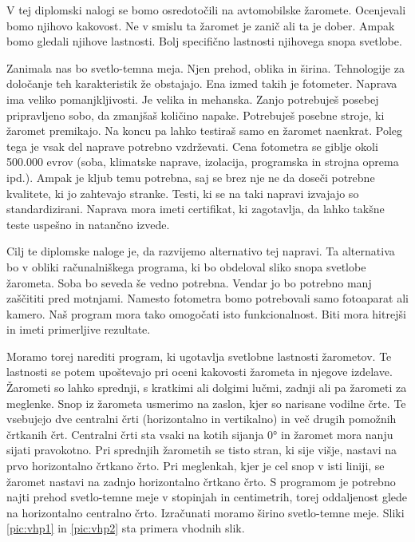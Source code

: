 \documentclass[oneside, a4paper, 12pt]{book}
\begin{document}
V tej diplomski nalogi se bomo osredotočili na avtomobilske žaromete. 
Ocenjevali bomo njihovo kakovost. Ne v smislu ta žaromet je zanič ali 
ta je dober. Ampak bomo gledali njihove lastnosti. Bolj specifično 
lastnosti njihovega snopa svetlobe.

Zanimala nas bo svetlo-temna meja. Njen prehod, oblika in širina. 
Tehnologije za določanje teh karakteristik že obstajajo. Ena izmed 
takih je fotometer. Naprava ima veliko pomanjkljivosti. Je velika in 
mehanska. Zanjo potrebuješ posebej pripravljeno sobo, da zmanjšaš količino 
napake. Potrebuješ posebne stroje, ki žaromet premikajo. Na koncu pa 
lahko testiraš samo en žaromet naenkrat. Poleg tega je vsak del 
naprave potrebno vzdrževati. Cena fotometra se giblje okoli 500.000 evrov
(soba, klimatske naprave, izolacija, programska in strojna oprema ipd.).
Ampak je kljub temu potrebna, saj se brez nje ne da doseči potrebne 
kvalitete, ki jo zahtevajo stranke. Tes\-ti, ki se na taki napravi 
izvajajo so standardizirani. Naprava mora imeti certifikat, ki zagotavlja, 
da lahko takšne teste uspešno in natančno izvede.

Cilj te diplomske naloge je, da razvijemo alternativo tej napravi. 
Ta alternativa bo v obliki računalniškega programa, ki bo obdeloval 
sliko snopa svetlobe žarometa. Soba bo seveda še vedno potrebna. 
Vendar jo bo potrebno manj zaščititi pred motnjami. Namesto fotometra 
bomo potrebovali samo fotoaparat ali kamero. Naš program mora tako 
omogočati isto funkcionalnost. Biti mora hitrejši in imeti primerljive 
rezultate.

Moramo torej narediti program, ki ugotavlja svetlobne lastnosti žarometov. 
Te lastnosti se potem upoštevajo pri oceni kakovosti žarometa in njegove 
izdelave. Žarometi so lahko sprednji, s kratkimi ali dolgimi lučmi, zadnji 
ali pa žarometi za meglenke. Snop iz žarometa usmerimo na zaslon, kjer so 
narisane vodilne črte. Te vsebujejo dve centralni črti (horizontalno in 
vertikalno) in več drugih pomožnih črtkanih črt. Centralni črti sta vsaki 
na kotih sijanja 0° in žaromet mora nanju sijati pravokotno. Pri sprednjih 
žarometih se tisto stran, ki sije višje, nastavi na prvo horizontalno 
črtkano črto. Pri meglenkah, kjer je cel snop v isti liniji, se žaromet 
nastavi na zadnjo horizontalno črtkano črto. S programom je potrebno najti 
prehod svetlo-temne meje v stopinjah in centimetrih, torej oddaljenost 
glede na horizontalno centralno črto. Izračunati moramo širino svetlo-temne 
meje. Sliki \ref{pic:vhp1} in \ref{pic:vhp2} sta primera vhodnih slik.
\end{document}
